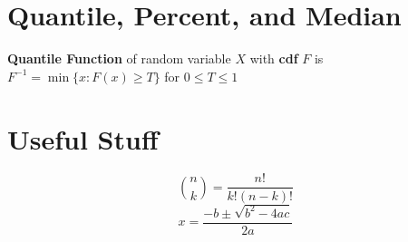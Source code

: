 \documentclass[5pt]{article}
\begin{document}
\section{Quantile, Percent, and Median}
\begin{definition}
\textbf{Quantile Function} of random variable $X$ with \textbf{cdf} $F$ is $F^{-1}=\min{\{x: F(x) \geq T\}}$ for $0\leq T \leq 1$
\end{definition}
\section{Useful Stuff}
\begin{equation}
{n \choose k} = \frac{n!}{k!(n-k)!}
\end{equation}
\begin{equation}
x=\frac{-b\pm\sqrt{b^2-4ac}}{2a}
\end{equation}
\end{document}
